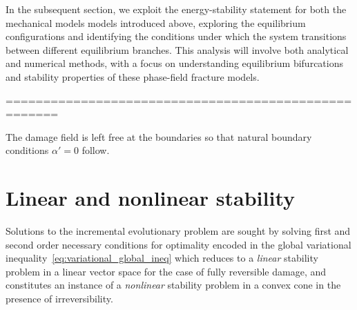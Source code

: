 

In the subsequent section, we exploit the energy-stability statement for both the mechanical models models introduced above, exploring the equilibrium configurations and identifying the conditions under which the system transitions between different equilibrium branches. 
This analysis will involve both analytical and numerical methods, with a focus on understanding equilibrium bifurcations and stability properties of these phase-field fracture models.

=====================================================





% 
The damage field is left free at the boundaries so that natural boundary conditions $\alpha'=0$ follow. 

\section{Linear and nonlinear stability}

Solutions to the incremental evolutionary problem are sought by solving first and second order necessary conditions for optimality encoded in the global variational inequality~\eqref{eq:variational_global_ineq} which reduces to a \emph{linear} stability problem in a linear vector space for the case of fully reversible damage, and constitutes an instance of a \emph{nonlinear} stability problem in a convex cone in the presence of irreversibility.

